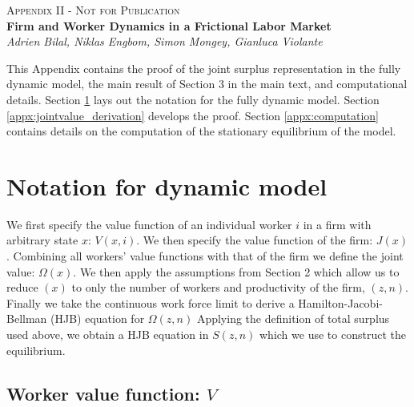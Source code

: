 


\setlength{\topmargin}{-0.6in}
\setlength{\textheight}{9.05in}
\setlength{\oddsidemargin}{-0.3in}
\setlength{\evensidemargin}{-0.2in}
\setlength{\textwidth}{7.23in}



\appendix
\begin{center}
\textsc{\huge Appendix II - Not for Publication}\vspace*{.5cm} \\
\textbf{\Large Firm and Worker Dynamics in a Frictional Labor Market}\vspace*{.5cm} \\
\emph{\Large Adrien Bilal, Niklas Engbom, Simon Mongey, Gianluca Violante}\vspace*{.5cm} \\
\end{center}

\small
{}

\noindent This Appendix contains the proof of the joint surplus representation in the fully dynamic model, the main result of Section 3 in the main text, and computational details.
Section \ref{appx:dynamicmodel} lays out the notation for the fully dynamic model.
Section \ref{appx:jointvalue_derivation} develops the proof.
Section \ref{appx:computation} contains details on the computation of the stationary equilibrium of the model.

\section{Notation for dynamic model}\label{appx:dynamicmodel}

We first specify the value function of an
individual worker $i$ in a firm with arbitrary state $x$: $V(x,i)$. We then
specify the value function of the firm: $J(x)$. Combining all workers' value
functions with that of the firm we define the joint value: $\Omega(x)$. We
then apply the assumptions from Section 2 which allow us
to reduce $(x)$ to only the number of workers and productivity of the firm, $%
(z,n)$. Finally we take the continuous work force limit to derive a
Hamilton-Jacobi-Bellman (HJB) equation for $\Omega(z,n)$ Applying the
definition of total surplus used above, we obtain a HJB equation in $S(z,n)$
which we use to construct the equilibrium.

\subsection{Worker value function: $V$}


